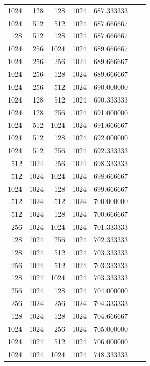 \documentclass{article}
\begin{document}
{\begin{longtable}{rrrrrrr}
1024 & 128 & 128 & 1024 & 687.333333 \\
1024 & 512 & 512 & 1024 & 687.666667 \\
128 & 512 & 128 & 1024 & 687.666667 \\
1024 & 256 & 1024 & 1024 & 689.666667 \\
1024 & 256 & 256 & 1024 & 689.666667 \\
1024 & 256 & 128 & 1024 & 689.666667 \\
1024 & 256 & 512 & 1024 & 690.000000 \\
1024 & 128 & 512 & 1024 & 690.333333 \\
1024 & 128 & 256 & 1024 & 691.000000 \\
1024 & 512 & 1024 & 1024 & 691.666667 \\
1024 & 512 & 128 & 1024 & 692.000000 \\
1024 & 512 & 256 & 1024 & 692.333333 \\
512 & 1024 & 256 & 1024 & 698.333333 \\
512 & 1024 & 1024 & 1024 & 698.666667 \\
1024 & 1024 & 128 & 1024 & 699.666667 \\
512 & 1024 & 512 & 1024 & 700.000000 \\
512 & 1024 & 128 & 1024 & 700.666667 \\
256 & 1024 & 1024 & 1024 & 701.333333 \\
128 & 1024 & 256 & 1024 & 702.333333 \\
128 & 1024 & 512 & 1024 & 703.333333 \\
256 & 1024 & 512 & 1024 & 703.333333 \\
128 & 1024 & 1024 & 1024 & 703.333333 \\
256 & 1024 & 128 & 1024 & 704.000000 \\
256 & 1024 & 256 & 1024 & 704.333333 \\
128 & 1024 & 128 & 1024 & 704.666667 \\
1024 & 1024 & 256 & 1024 & 705.000000 \\
1024 & 1024 & 512 & 1024 & 706.000000 \\
1024 & 1024 & 1024 & 1024 & 748.333333 \\
\end{longtable}
}
\end{document}
